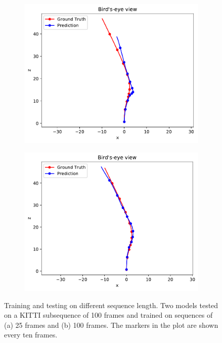 		\begin{figure}
			\centering
			\begin{subfigure}[b]{0.5\linewidth}
				\centering
				\includegraphics[width=\linewidth]{Images/Experiments/trained-on-25-frames}
				\caption{
					\label{fig:0}
				}
			\end{subfigure}%
			\begin{subfigure}[b]{0.5\linewidth}
				\centering
				\includegraphics[width=\linewidth]{Images/Experiments/trained-on-100-frames}
				\caption{
					\label{fig:1}
				}
			\end{subfigure}%
			\caption[Training and testing on different sequence length]
					{Training and testing on different sequence length. 
					 Two models tested on a KITTI subsequence of 100 frames and trained on sequences of (a) 25 frames and (b) 100 frames. 
					 The markers in the plot are shown every ten frames.
					 \label{fig:kitti-testing-on-longer-sequences}}
		\end{figure}
	
